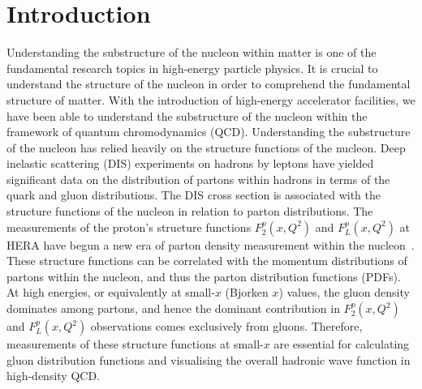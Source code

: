 \documentclass[12pt]{article}
\begin{document}
\section{Introduction}
\label{sec:intro}
Understanding the substructure of the nucleon within matter is one of the fundamental research topics in high-energy particle physics. It is crucial to understand the structure of the nucleon in order to comprehend the fundamental structure of matter. With the introduction of high-energy accelerator facilities, we have been able to understand the substructure of the nucleon within the framework of quantum chromodynamics (QCD). Understanding the substructure of the nucleon has relied heavily on the structure functions of the nucleon. Deep inelastic scattering (DIS) experiments on hadrons by leptons have yielded significant data on the distribution of partons within hadrons in terms of the quark and gluon distributions. The DIS cross section is associated with the structure functions of the nucleon in relation to parton distributions. The measurements of the proton's structure functions $F_2 ^p (x, Q^2)$ and $F_L ^p (x, Q^2)$ at HERA have begun a new era of parton density measurement within the nucleon~\cite{1,2,3,4}. These structure functions can be correlated with the momentum distributions of partons within the nucleon, and thus the parton distribution functions (PDFs). At high energies, or equivalently at small-$x$ (Bjorken $x$) values, the gluon density dominates among partons, and hence the dominant contribution in $F_2 ^p (x, Q^2)$ and $F_L ^p (x, Q^2)$ observations comes exclusively from gluons. Therefore, measurements of these structure functions at small-$x$ are essential for calculating gluon distribution functions and visualising the overall hadronic wave function in high-density QCD.
\end{document}
